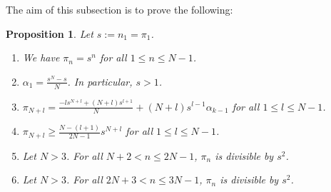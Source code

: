 \documentclass[reqno]{amsart}
\numberwithin{equation}{section}
\theoremstyle{plain}
\newtheorem{prop}[equation]{Proposition}
\theoremstyle{definition}
\begin{document}
The aim of this subsection is to prove the following:

\begin{prop}\label{seqp}
Let $s:=n_1=\pi_1$.
\begin{enumerate}
    \item We have $\pi_n=s^n$ for all $1\leq n\leq N-1$.
    \item $\alpha_1=\frac{s^N-s}{N}$. In particular, $s>1$.
    \item $\pi_{N+l}=\frac{-ls^{N+l}+(N+l)s^{l+1}}{N}+(N+l)s^{l-1}\alpha_{k-1}$ for all $1\leq l\leq N-1$.
    \item $\pi_{N+l}\geq\frac{N-(l+1)}{2N-1}s^{N+l}$ for all $1\leq l\leq N-1$.
    \item Let $N>3$. For all $N+2<n\leq 2N-1$, $\pi_n$ is divisible by $s^2$.
    \item Let $N>3$. For all $2N+3<n\leq 3N-1$, $\pi_n$ is divisible by $s^2$.

    
    
\end{enumerate}
\end{prop}
\end{document}
